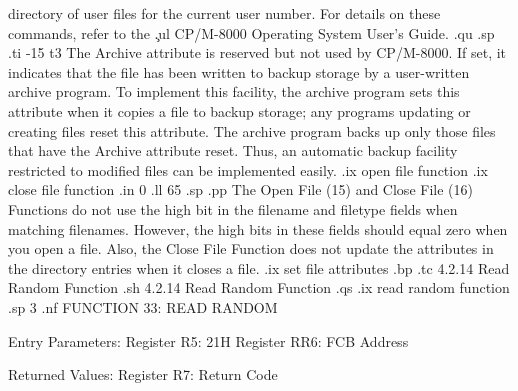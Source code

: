 directory of user files for the current user number.   For
details on these commands, refer to the \c
.ul
CP/M-8000 Operating System User's Guide. 
.qu
.sp
.ti -15
t3             The Archive attribute is reserved but not used by CP/M-8000.
If set, it indicates that the file has been written to backup storage by 
a user-written archive program.  To implement this facility, the archive 
program sets this attribute when it copies a file to backup storage;
any programs updating or creating files reset this
attribute.  The archive program backs up only those files that have
the Archive attribute reset.  Thus, an automatic backup facility restricted to
modified files can be implemented easily.
.ix open file function
.ix close file function
.in 0
.ll 65
.sp
.pp
The Open File (15) and Close File (16) Functions do not use the high bit in
the filename and filetype fields when matching filenames.
However, the high bits in these fields should equal zero when you
open a file. Also, the Close File Function does not update the
attributes in the directory entries when it closes a file. 
.ix set file attributes
.bp
.tc         4.2.14  Read Random Function
.sh
4.2.14  Read Random Function
.qs
.ix read random function
.sp 3
.nf
                    FUNCTION 33:  READ RANDOM

              Entry Parameters:
                 Register   R5:  21H
                 Register  RR6:  FCB Address

              Returned  Values:
                 Register   R7:  Return Code

